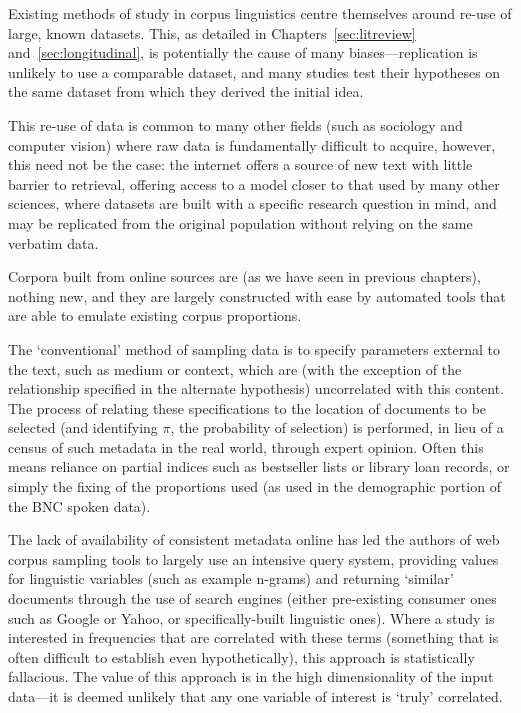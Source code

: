 

Existing methods of study in corpus linguistics centre themselves around re-use of large, known datasets.  This, as detailed in Chapters~\ref{sec:litreview} and~\ref{sec:longitudinal}, is potentially the cause of many biases---replication is unlikely to use a comparable dataset, and many studies test their hypotheses on the same dataset from which they derived the initial idea.

This re-use of data is common to many other fields (such as sociology and computer vision) where raw data is fundamentally difficult to acquire, however, this need not be the case: the internet offers a source of new text with little barrier to retrieval, offering access to a model closer to that used by many other sciences, where datasets are built with a specific research question in mind, and may be replicated from the original population without relying on the same verbatim data.

Corpora built from online sources are (as we have seen in previous chapters), nothing new, and they are largely constructed with ease by automated tools that are able to emulate existing corpus proportions.

The `conventional' method of sampling data is to specify parameters external to the text, such as medium or context, which are (with the exception of the relationship specified in the alternate hypothesis) uncorrelated with this content.  The process of relating these specifications to the location of documents to be selected (and identifying $\pi$, the probability of selection) is performed, in lieu of a census of such metadata in the real world, through expert opinion.  Often this means reliance on partial indices such as bestseller lists or library loan records, or simply the fixing of the proportions used (as used in the demographic portion of the BNC spoken data).


The lack of availability of consistent metadata online has led the authors of web corpus sampling tools to largely use an intensive query system, providing values for linguistic variables (such as example n-grams) and returning `similar' documents through the use of search engines (either pre-existing consumer ones such as Google or Yahoo, or specifically-built linguistic ones).  Where a study is interested in frequencies that are correlated with these terms (something that is often difficult to establish even hypothetically), this approach is statistically fallacious.  The value of this approach is in the high dimensionality of the input data---it is deemed unlikely that any one variable of interest is `truly' correlated.


